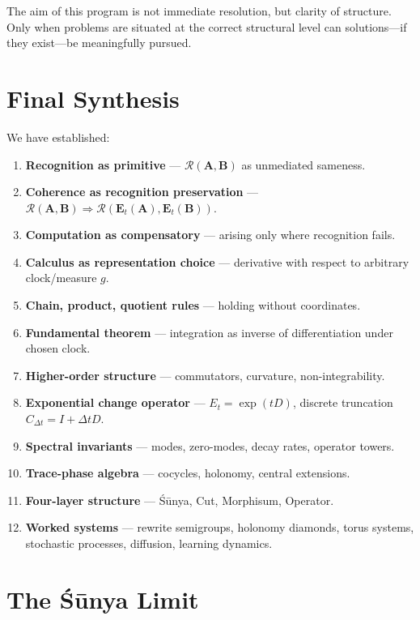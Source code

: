 \documentclass[12pt, oneside]{article}
\newcommand{\R}{\mathcal{R}}
\begin{document}
The aim of this program is not immediate resolution, but clarity of structure. Only when problems are situated at the correct structural level can solutions—if they exist—be meaningfully pursued.

\section{Final Synthesis}

We have established:

\begin{enumerate}
    \item \textbf{Recognition as primitive} — $\R(\mathbf{A},\mathbf{B})$ as unmediated sameness.
    \item \textbf{Coherence as recognition preservation} — $\R(\mathbf{A},\mathbf{B}) \Rightarrow \R(\mathbf{E}_t(\mathbf{A}),\mathbf{E}_t(\mathbf{B}))$.
    \item \textbf{Computation as compensatory} — arising only where recognition fails.
    \item \textbf{Calculus as representation choice} — derivative with respect to arbitrary clock/measure $g$.
    \item \textbf{Chain, product, quotient rules} — holding without coordinates.
    \item \textbf{Fundamental theorem} — integration as inverse of differentiation under chosen clock.
    \item \textbf{Higher-order structure} — commutators, curvature, non-integrability.
    \item \textbf{Exponential change operator} — $E_t = \exp(tD)$, discrete truncation $C_{\Delta t} = I + \Delta t D$.
    \item \textbf{Spectral invariants} — modes, zero-modes, decay rates, operator towers.
    \item \textbf{Trace-phase algebra} — cocycles, holonomy, central extensions.
    \item \textbf{Four-layer structure} — Śūnya, Cut, Morphisum, Operator.
    \item \textbf{Worked systems} — rewrite semigroups, holonomy diamonds, torus systems, stochastic processes, diffusion, learning dynamics.
\end{enumerate}

\section{The Śūnya Limit}
\end{document}
